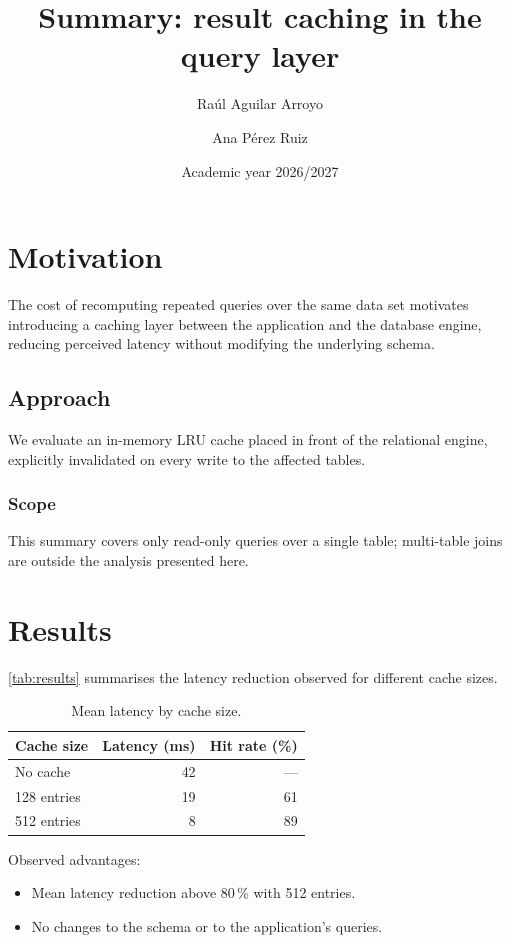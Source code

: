 \documentclass[10pt]{article}
\title{Summary: result caching in the query layer}
\author{Raúl Aguilar Arroyo \and Ana Pérez Ruiz}
\date{Academic year 2026/2027}
\begin{document}
\maketitle

\section{Motivation}

The cost of recomputing repeated queries over the same data set motivates
introducing a caching layer between the application and the database
engine, reducing perceived latency without modifying the underlying
schema.

\subsection{Approach}

We evaluate an in-memory LRU cache placed in front of the relational
engine, explicitly invalidated on every write to the affected tables.

\subsubsection{Scope} This summary covers only read-only queries over a
single table; multi-table joins are outside the analysis presented here.

\section{Results}

\autoref{tab:results} summarises the latency reduction observed for
different cache sizes.

\begin{table}[h]
  \centering
  \caption{Mean latency by cache size.}
  \label{tab:results}
  \begin{tabular}{@{}lrr@{}}
    \toprule
    Cache size & Latency (ms) & Hit rate (\%) \\
    \midrule
    No cache & 42 & --- \\
    128 entries & 19 & 61 \\
    512 entries & 8 & 89 \\
    \bottomrule
  \end{tabular}
\end{table}

Observed advantages:
\begin{itemize}
  \item Mean latency reduction above 80\,\% with 512 entries.
  \item No changes to the schema or to the application's queries.
\end{itemize}
\end{document}
